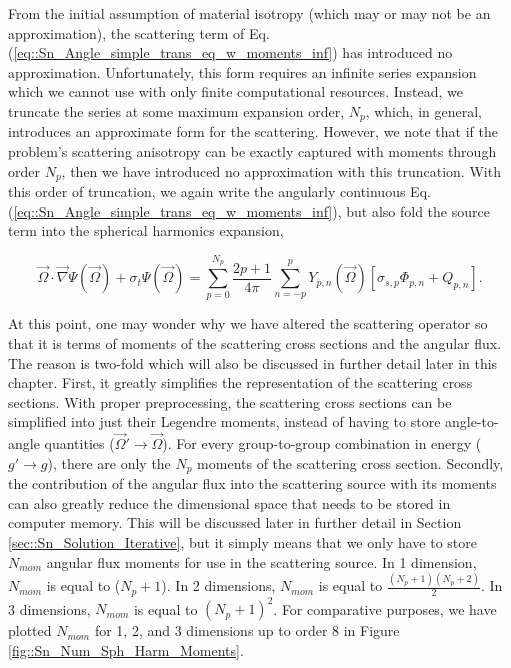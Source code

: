 From the initial assumption of material isotropy (which may or may not be an approximation), the scattering term of Eq. (\ref{eq::Sn_Angle_simple_trans_eq_w_moments_inf}) has introduced no approximation. Unfortunately, this form requires an infinite series expansion which we cannot use with only finite computational resources. Instead, we truncate the series at some maximum expansion order, $N_p$, which, in general, introduces an approximate form for the scattering. However, we note that if the problem's scattering anisotropy can be exactly captured with moments through order $N_p$, then we have introduced no approximation with this truncation. With this order of truncation, we again write the angularly continuous Eq. (\ref{eq::Sn_Angle_simple_trans_eq_w_moments_inf}), but also fold the source term into the spherical harmonics expansion,

\begin{equation}
\label{eq::Sn_Angle_simple_trans_eq_w_moments_trunc}
\vec{\Omega} \cdot \vec{\nabla} \Psi (\vec{\Omega}) + \sigma_t \Psi (\vec{\Omega}) = \sum_{p=0}^{N_p} \frac{2p + 1}{4 \pi}   \sum_{n=-p}^{p}   Y_{p,n} (  \vec{\Omega} ) \left[ \sigma_{s,p} \Phi_{p,n} + Q_{p,n}  \right] .
\end{equation}

At this point, one may wonder why we have altered the scattering operator so that it is terms of moments of the scattering cross sections and the angular flux. The reason is two-fold which will also be discussed in further detail later in this chapter. First, it greatly simplifies the representation of the scattering cross sections. With proper preprocessing, the scattering cross sections can be simplified into just their Legendre moments, instead of having to store angle-to-angle quantities ($\vec{\Omega}' \rightarrow \vec{\Omega}$). For every group-to-group combination in energy ($g' \rightarrow g$), there are only the $N_p$ moments of the scattering cross section. Secondly, the contribution of the angular flux into the scattering source with its moments can also greatly reduce the dimensional space that needs to be stored in computer memory. This will be discussed later in further detail in Section \ref{sec::Sn_Solution_Iterative}, but it simply means that we only have to store $N_{mom}$ angular flux moments for use in the scattering source. In 1 dimension, $N_{mom}$ is equal to ($N_p + 1$). In 2 dimensions, $N_{mom}$ is equal to $\frac{(N_p + 1) (N_p + 2)}{2}$. In 3 dimensions, $N_{mom}$ is equal to $(N_p + 1)^2$. For comparative purposes, we have plotted $N_{mom}$ for 1, 2, and 3 dimensions up to order 8 in Figure \ref{fig::Sn_Num_Sph_Harm_Moments}.

